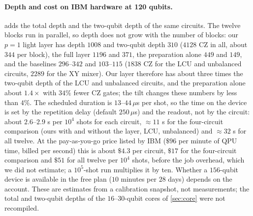 \paragraph{Depth and cost on IBM hardware at 120 qubits.}   adds the total depth and the two-qubit depth of the same circuits. The twelve blocks run in parallel, so depth does not grow with the number of blocks: our $p=1$ light layer has depth $1008$ and two-qubit depth $310$ ($4128$ CZ in all, about $344$ per block), the full layer $1196$ and $371$, the preparation alone $449$ and $149$, and the baselines $296$--$342$ and $103$--$115$ ($1838$ CZ for the LCU and unbalanced circuits, $2289$ for the XY mixer). Our layer therefore has about three times the two-qubit depth of the LCU and unbalanced circuits, and the preparation alone about $1.4\times$ with $34\%$ fewer CZ gates; the tilt changes these numbers by less than $4\%$. The scheduled duration is $13$--$44\,\mu$s per shot, so the time on the device is set by the repetition delay (default $250\,\mu$s) and the readout, not by the circuit: about $2.6$--$2.9$ s per $10^4$ shots for each circuit, $\approx11$ s for the four-circuit comparison (ours with and without the layer, LCU, unbalanced) and $\approx32$ s for all twelve. At the pay-as-you-go price listed by IBM ($\$96$ per minute of QPU time, billed per second) this is about $\$4.3$ per circuit, $\$17$ for the four-circuit comparison and $\$51$ for all twelve per $10^4$ shots, before the job overhead, which we did not estimate; a $10^5$-shot run multiplies it by ten. Whether a $156$-qubit device is available in the free plan ($10$ minutes per $28$ days) depends on the account. These are estimates from a calibration snapshot, not measurements; the total and two-qubit depths of the $16$--$30$-qubit cores of \cref{sec:core} were not recompiled.

